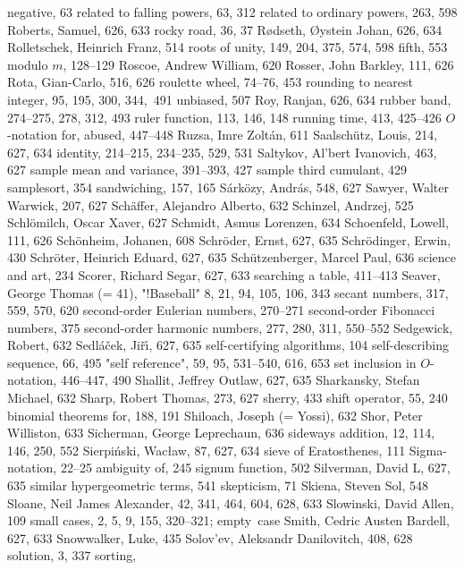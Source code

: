 \sub negative, 63
\sub related to falling powers, 63, 312
\sub related to ordinary powers, 263, 598
Roberts, Samuel, 626, 633
rocky road, 36, 37
R{\o}dseth, {\O}ystein Johan, 626, 634
Rolletschek, Heinrich Franz, 514
roots of unity, 149, 204, 375, 574, 598
\sub fifth, 553
\sub modulo $m$, 128--129
Roscoe, Andrew William, 620
Rosser, John Barkley, 111, 626
Rota, Gian-Carlo, 516, 626
roulette wheel, 74--76, 453
rounding to nearest integer, 95, 195, 300, 344,~491
\sub unbiased, 507
Roy, Ranjan, 626, 634
rubber band, 274--275, 278, 312, 493
ruler function, 113, 146, 148
running time, 413, 425--426
\sub $O$-notation for, abused, 447--448
Ruzsa, Imre Zolt\'an, 611
\medskip
Saalsch\"utz, Louis, 214, 627, 634
\sub identity, 214--215, 234--235, 529, 531
Saltykov, Al'bert Ivanovich, 463, 627
sample mean and variance, 391--393, 427
sample third cumulant, 429
samplesort, 354
sandwiching, 157, 165
S\'ark\"ozy, Andr\'as, 548, 627
Sawyer, Walter Warwick, 207, 627
Sch\"affer, Alejandro Alberto, 632
Schinzel, Andrzej, 525
Schl\"omilch, Oscar Xaver, 627
Schmidt, Asmus Lorenzen, 634
Schoenfeld, Lowell, 111, 626
Sch\"onheim, Johanen, 608
Schr\"oder, Ernst, 627, 635
Schr\"odinger, Erwin, 430
Schr\"oter, Heinrich Eduard, 627, 635
Sch\"utzenberger, Marcel Paul, 636
science and art, 234
Scorer, Richard Segar, 627, 633
searching a table, 411--413
Seaver, George Thomas (= 41), "!Baseball" 8, 21, 94, 105, 106, 343
secant numbers, 317, 559, 570, 620
second-order Eulerian numbers, 270--271
second-order Fibonacci numbers, 375
second-order harmonic numbers, 277, 280, 311, 550--552
Sedgewick, Robert, 632
Sedl\'a\v cek, Ji\v r{\'\i}, 627, 635
self-certifying algorithms, 104
self-describing sequence, 66, 495
"self reference", 59, 95, 531--540, 616, 653
set inclusion in $O$-notation, 446--447, 490
Shallit, Jeffrey Outlaw, 627, 635
Sharkansky, Stefan Michael, 632
Sharp, Robert Thomas, 273, 627
sherry, 433
shift operator, 55, 240
\sub binomial theorems for, 188, 191
Shiloach, Joseph (= Yossi), 632
Shor, Peter Williston, 633
Sicherman, George Leprechaun, 636
sideways addition, 12, 114, 146, 250, 552
Sierpi\'nski, Wac{\l}aw, 87, 627, 634
sieve of Eratosthenes, 111
Sigma-notation, 22--25
\sub ambiguity of, 245
signum function, 502
Silverman, David L, 627, 635
similar hypergeometric terms, 541
skepticism, 71
Skiena, Steven Sol, 548
Sloane, Neil James Alexander, 42, 341, 464, 604, 628, 633
Slowinski, David Allen, 109
small cases, 2, 5, 9, 155, 320--321; \also empty~case
Smith, Cedric Austen Bardell, 627, 633
Snowwalker, Luke, 435
Solov'ev, Aleksandr Danilovitch, 408, 628
solution, 3, 337
sorting,
